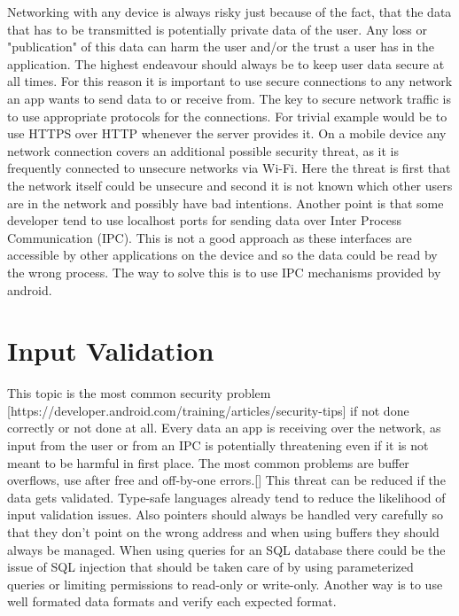 Networking with any device is always risky just because of the fact, that the data that has to be transmitted is potentially private data of the user. Any loss or "publication" of this data can harm the user and/or the trust a user has in the application. The highest endeavour should always be to keep user data secure at all times. For this reason it is important to use secure connections to any network an app wants to send data to or receive from. 
The key to secure network traffic is to use appropriate protocols for the connections. For trivial example would be to use HTTPS over HTTP whenever the server provides it.
On a mobile device any network connection covers an additional possible security threat, as it is frequently connected to unsecure networks via Wi-Fi. Here the threat is first that the network itself could be unsecure and second it is not known which other users are in the network and possibly have bad intentions.
Another point is that some developer tend to use localhost ports for sending data over Inter Process Communication (IPC). This is not a good approach as these interfaces are accessible by other applications on the device and so the data could be read by the wrong process. The way to solve this is to use IPC mechanisms provided by android.

\section{Input Validation}
\label{chp:howto:sec:inputValidation}

This topic is the most common security problem [https://developer.android.com/training/articles/security-tips] if not done correctly or not done at all. Every data an app is receiving over the network, as input from the user or from an IPC is potentially threatening even if it is not meant to be harmful in first place.
The most common problems are buffer overflows, use after free and off-by-one errors.[] This threat can be reduced if the data gets validated.
Type-safe languages already tend to reduce the likelihood of input validation issues. Also pointers should always be handled very carefully so that they don't point on the wrong address and when using buffers they should always be managed.
When using queries for an SQL database there could be the issue of SQL injection that should be taken care of by using parameterized queries or limiting permissions to read-only or write-only. Another way is to use well formated data formats and verify each expected format.

